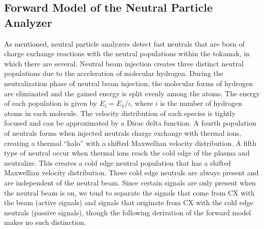 \subsection{Forward Model of the Neutral Particle Analyzer}
As mentioned, neutral particle analyzers detect fast neutrals that are born of charge exchange reactions with the neutral populations within the tokamak, in which there are several.
Neutral beam injection creates three distinct neutral populations due to the acceleration of molecular hydrogen.
During the neutralization phase of neutral beam injection, the molecular forms of hydrogen are eliminated and the gained energy is split evenly among the atoms.
The energy of each population is given by $E_i = E_1/i$, where $i$ is the number of hydrogen atoms in each molecule.
The velocity distribution of each species is tightly focused and can be approximated by a Dirac delta function.
A fourth population of neutrals forms when injected neutrals charge exchange with thermal ions, creating a thermal ``halo'' with a shifted Maxwellian velocity distribution. A fifth type of neutral occur when thermal ions reach the cold edge of the plasma and neutralize. This creates a cold edge neutral population that has a shifted Maxwellian velocity distribution. These cold edge neutrals are always present and are independent of the neutral beam. Since certain signals are only present when the neutral beam is on, we tend to separate the signals that come from CX with the beam (active signals) and signals that originate from CX with the cold edge neutrals (passive signals), though the following derivation of the forward model makes no such distinction.

